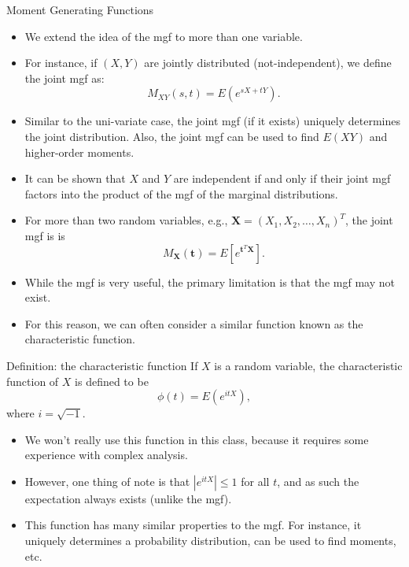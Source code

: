 \begin{frame}[allowframebreaks]{Moment Generating Functions}
  \begin{itemize}
    \item We extend the idea of the mgf to more than one variable.
    \item For instance, if $(X, Y)$ are jointly distributed (not-independent), we define the joint mgf as:
    $$
    M_{XY}(s, t) = E(e^{sX + tY}).
    $$
    \item Similar to the uni-variate case, the joint mgf (if it exists) uniquely determines the joint distribution. Also, the joint mgf can be used to find $E(XY)$ and higher-order moments.
    \item It can be shown that $X$ and $Y$ are independent if and only if their joint mgf factors into the product of the mgf of the marginal distributions.
    \item For more than two random variables, e.g., $\bm{X} = (X_1, X_2, \ldots, X_n)^T$, the joint mgf is is 
    $$
    M_{\bm{X}}(\bm{t}) = E[e^{\bm{t}^T \bm{X}}].
    $$
    \item While the mgf is very useful, the primary limitation is that the mgf may not exist.
    \item For this reason, we can often consider a similar function known as the \alert{characteristic function}.
  \end{itemize}
  
  \begin{block}{Definition: the characteristic function}
    If $X$ is a random variable, the \alert{characteristic function} of $X$ is defined to be
    $$
    \phi(t) = E(e^{itX}),
    $$
    where $i = \sqrt{-1}$. 
  \end{block}
  
  \begin{itemize}
    \item We won't really use this function in this class, because it requires some experience with complex analysis.
    \item However, one thing of note is that $|e^{itX}| \leq 1$ for all $t$, and as such the expectation always exists (unlike the mgf).
    \item This function has many similar properties to the mgf. For instance, it uniquely determines a probability distribution, can be used to find moments, etc. 
  \end{itemize}
  
\end{frame}

